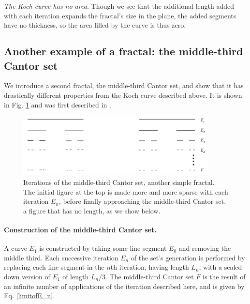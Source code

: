 \begin{myobs}\textit{The Koch curve has no area.} Though we see that the additional length added with each iteration expands the fractal's size in the plane, the added segments have no thickness, so the area filled by the curve is thus zero.\end{myobs}


\subsection{Another example of a fractal: the middle-third Cantor set}

We introduce a second fractal, the middle-third Cantor set, and show that it has drastically different properties from the Koch curve described above. It is shown in Fig. \ref{fig:cantorset} and was first described in \citep{Cantorset}.

\begin{figure}[h]
\centering
\includegraphics[width=0.9\textwidth]{Chapters/Figures/cantorset.png} 
\caption[Middle-third Cantor set]{Iterations of the middle-third Cantor set, another simple fractal. The initial figure at the top is made more and more sparse with each iteration $E_n$, before finally approaching the middle-third Cantor set, a figure that has no length, as we show below.}\label{fig:cantorset}
\end{figure}

\paragraph{Construction of the middle-third Cantor set.} 
A curve $E_1$ is constructed by taking some line segment $E_0$ and removing the middle third. Each successive iteration $E_n$ of the set's generation is performed by replacing each line segment in the $n$th iteration, having length $L_n$, with a scaled-down version of $E_1$ of length $L_n/3$. The middle-third Cantor set $F$ is the result of an infinite number of applications of the iteration described here, and is given by Eq. \ref{limitofE_n}.

